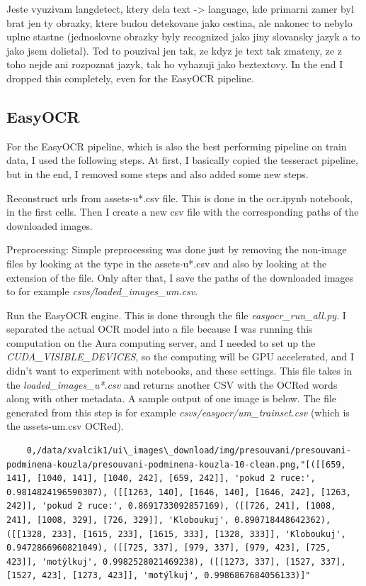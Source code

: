 \documentclass[
  digital,     %
  oneside,     %
  nosansbold,  %
  nocolorbold, %
  nolof,         %
  nolot,         %
]{fithesis4}
\begin{document}
Jeste vyuzivam langdetect, ktery dela text -> language, kde primarni zamer byl brat jen ty obrazky, ktere budou detekovane jako cestina, ale nakonec to nebylo uplne stastne (jednoslovne obrazky byly recognized jako jiny slovansky jazyk a to jako jsem dolietal). Ted to pouzival jen tak, ze kdyz je text tak zmateny, ze z toho nejde ani rozpoznat jazyk, tak ho vyhazuji jako beztextovy. In the end I dropped this completely, even for the EasyOCR pipeline.

\subsection{EasyOCR}

For the EasyOCR pipeline, which is also the best performing pipeline on train data, I used the following steps. At first, I basically copied the tesseract pipeline, but in the end, I removed some steps and also added some new steps.

Reconstruct urls from assets-u*.csv file. This is done in the ocr.ipynb notebook, in the first cells. Then I create a new csv file with the corresponding paths of the downloaded images.

Preprocessing: Simple preprocessing was done just by removing the non-image files by looking at the type in the assets-u*.csv and also by looking at the extension of the file. Only after that, I save the paths of the downloaded images to for example \emph{csvs/loaded\_images\_um.csv}.

Run the EasyOCR engine. This is done through the file \emph{easyocr\_run\_all.py}. I separated the actual OCR model into a file because I was running this computation on the Aura computing server, and I needed to set up the \emph{CUDA\_VISIBLE\_DEVICES}, so the computing will be GPU accelerated, and I didn't want to experiment with notebooks, and these settings. This file takes in the \emph{loaded\_images\_u*.csv} and returns another CSV with the OCRed words along with other metadata. A sample output of one image is below. The file generated from this step is for example \emph{csvs/easyocr/um\_trainset.csv} (which is the assets-um.csv OCRed).

\begin{verbatim}
    0,/data/xvalcik1/ui\_images\_download/img/presouvani/presouvani-podminena-kouzla/presouvani-podminena-kouzla-10-clean.png,"[([[659, 141], [1040, 141], [1040, 242], [659, 242]], 'pokud 2 ruce:', 0.9814824196590307), ([[1263, 140], [1646, 140], [1646, 242], [1263, 242]], 'pokud 2 ruce:', 0.8691733092857169), ([[726, 241], [1008, 241], [1008, 329], [726, 329]], 'Kloboukuj', 0.890718448642362), ([[1328, 233], [1615, 233], [1615, 333], [1328, 333]], 'Kloboukuj', 0.9472866960821049), ([[725, 337], [979, 337], [979, 423], [725, 423]], 'motýlkuj', 0.9982528021469238), ([[1273, 337], [1527, 337], [1527, 423], [1273, 423]], 'motýlkuj', 0.9986867684056133)]"
\end{verbatim}
\end{document}
